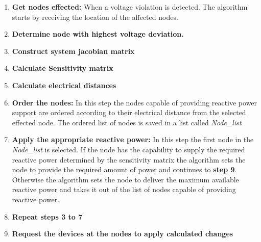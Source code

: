 \begin{enumerate}
\item \textbf{Get nodes effected:} When a voltage violation is detected. The algorithm starts by receiving the location of the affected nodes.
\item \textbf{Determine node with highest voltage deviation.}
\item \textbf{Construct system jacobian matrix}
\item \textbf{Calculate Sensitivity matrix}
\item \textbf{Calculate electrical distances}
\item \textbf{Order the nodes:} In this step the nodes capable of providing reactive power support are ordered according to their electrical distance from the selected effected node. The ordered list of nodes is saved in a list called \textit{Node\_list}
\item \textbf{Apply the appropriate reactive power:} In this step the first node in the \textit{Node\_list} is selected. If the node has the capability to supply the required reactive power determined by the sensitivity matrix the algorithm sets the node to provide the required amount of power and continues to \textbf{step 9}. Otherwise the algorithm sets the node to deliver the maximum available reactive power and takes it out of the list of nodes capable of providing reactive power.
\item \textbf{Repeat steps 3 to 7}
\item \textbf{Request the devices at the nodes to apply calculated changes}
\end{enumerate}